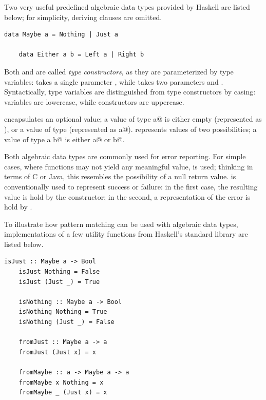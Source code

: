 \documentclass[UdineBachThesis,american,11pt]{PhdThesis}
\begin{document}
  Two very useful predefined algebraic data types provided by Haskell are listed
  below; for simplicity, deriving clauses are omitted.

  \begin{lstlisting}[gobble=4,basicstyle=\ttfamily\small]
    data Maybe a = Nothing | Just a

    data Either a b = Left a | Right b
  \end{lstlisting}

  Both \lstinline@Maybe@ and \lstinline@Either@ are called \emph{type
  constructors}, as they are parameterized by type variables: \lstinline@Maybe@
  takes a single parameter \lstinline@a@, while \lstinline@Either@ takes two
  parameters \lstinline@a@ and \lstinline@b@. Syntactically, type variables are
  distinguished from type constructors by casing: variables are lowercase, while
  constructors are uppercase.

  \lstinline@Maybe@ encapsulates an optional value; a value of type
  \lstinline@Maybe a@ is either empty (represented as \lstinline@Nothing@), or a
  value of type \lstinline@a@ (represented as \lstinline@Just a@).
  \lstinline@Either@ represents values of two possibilities; a value of type
  \lstinline@Either a b@ is either \lstinline@Left a@ or \lstinline@Right b@.


  Both algebraic data types are commonly used for error reporting. For simple
  cases, where functions may not yield any meaningful value, \lstinline@Maybe@
  is used; thinking in terms of C or Java, this resembles the possibility of a
  null return value. \lstinline@Either@ is conventionally used to represent
  success or failure: in the first case, the resulting value is hold by the
  \lstinline@Right@ constructor; in the second, a representation of the error is
  hold by \lstinline@Left@.

  To illustrate how pattern matching can be used with algebraic data types,
  implementations of a few utility functions from Haskell's standard library
  are listed below.

  \begin{lstlisting}[gobble=4,basicstyle=\ttfamily\small]
    isJust :: Maybe a -> Bool
    isJust Nothing = False
    isJust (Just _) = True

    isNothing :: Maybe a -> Bool
    isNothing Nothing = True
    isNothing (Just _) = False

    fromJust :: Maybe a -> a
    fromJust (Just x) = x

    fromMaybe :: a -> Maybe a -> a
    fromMaybe x Nothing = x
    fromMaybe _ (Just x) = x
  \end{lstlisting}
\end{document}
